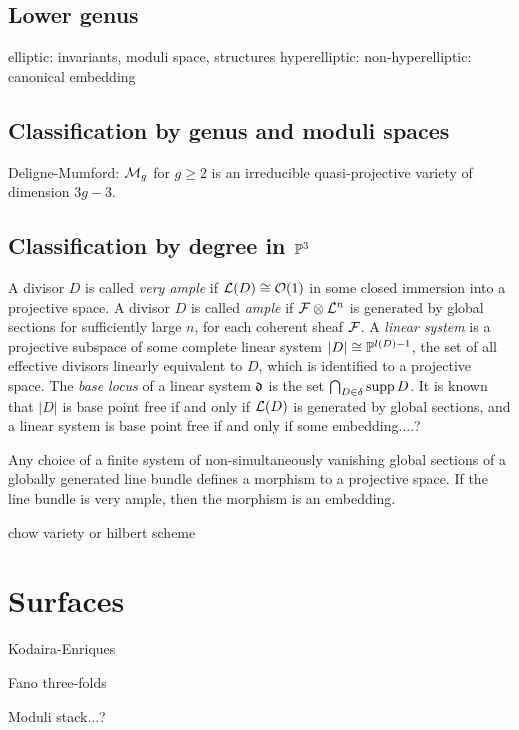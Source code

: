 \documentclass{../../large}
\begin{document}
\section{Lower genus}
elliptic: invariants, moduli space, structures
hyperelliptic: 
non-hyperelliptic: canonical embedding


\section{Classification by genus and moduli spaces}
Deligne-Mumford: $\cM_g$ for $g\ge2$ is an irreducible quasi-projective variety of dimension $3g-3$.

\section{Classification by degree in $\P^3$}

A divisor $D$ is called \emph{very ample} if $\cL(D)\cong\cO(1)$ in some closed immersion into a projective space.
A divisor $D$ is called \emph{ample} if $\cF\otimes\cL^n$ is generated by global sections for sufficiently large $n$, for each coherent sheaf $\cF$.
A \emph{linear system} is a projective subspace of some complete linear system $|D|\cong\P^{l(D)-1}$, the set of all effective divisors linearly equivalent to $D$, which is identified to a projective space.
The \emph{base locus} of a linear system $\fd$ is the set $\bigcap_{D\in\delta}\supp D$.
It is known that $|D|$ is base point free if and only if $\cL(D)$ is generated by global sections, and a linear system is base point free if and only if some embedding....?

Any choice of a finite system of non-simultaneously vanishing global sections of a globally generated line bundle defines a morphism to a projective space.
If the line bundle is very ample, then the morphism is an embedding.

chow variety or hilbert scheme


\chapter{Surfaces}

Kodaira-Enriques

Fano three-folds


Moduli stack...?
\end{document}
